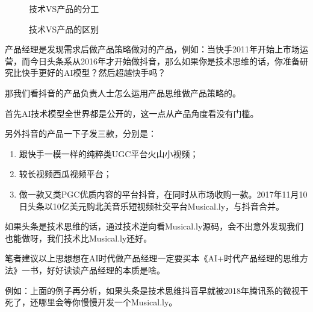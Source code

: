 \documentclass[letterpaper,11pt,english]{sphinxmanual}
\begin{document}
\begin{figure}[H]
\centering
\capstart

\noindent{}
\caption{技术VS产品的分工}\label{\detokenize{chapter_introduction/PM:id73}}\end{figure}

\begin{figure}[H]
\centering
\capstart

\noindent{}
\caption{技术VS产品的区别\sphinxfootnotemark[163]}\label{\detokenize{chapter_introduction/PM:id74}}\end{figure}
%
\begin{footnotetext}[163]\sphinxAtStartFootnote
{}
%
\end{footnotetext}\ignorespaces 
产品经理是发现需求后做产品策略做对的产品，例如：当快手2011年开始上市场运营，而今日头条系从2016年才开始做抖音，那么如果你是技术思维的话，你准备研究比快手更好的AI模型？然后超越快手吗？

那我们看抖音的产品负责人士怎么运用产品思维做产品策略的。

首先AI技术模型全世界都是公开的，这一点从产品角度看没有门槛。

另外抖音的产品一下子发三款，分别是：
\begin{enumerate}
%
\item {} 
跟快手一模一样的纯粹类UGC平台火山小视频；

\item {} 
较长视频西瓜视频平台；

\item {} 
做一款又类PGC优质内容的平台抖音，在同时从市场收购一款。2017年11月10日头条以10亿美元购北美音乐短视频社交平台Musical.ly，与抖音合并。

\end{enumerate}

如果头条是技术思维的话，通过技术逆向看Musical.ly源码，会不出意外发现我们也能做呀，我们技术比Musical.ly还好。

笔者建议以上思想想在AI时代做产品经理一定要买本《AI+时代产品经理的思维方法》一书，好好读读产品经理的本质是啥。

例如：上面的例子再分析，如果头条是技术思维抖音早就被2018年腾讯系的微视干死了，还哪里会等你慢慢开发一个Musical.ly。
\end{document}
